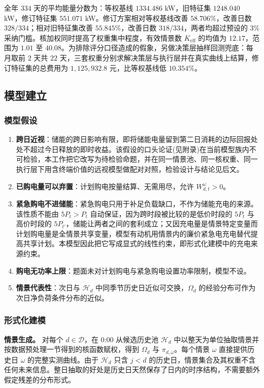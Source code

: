 全年 $334$ 天的平均能量分数为：等权基线 $1334.486$ kW，旧特征集 $1248.040$ kW，修订特征集 $551.071$ kW。修订方案相对等权基线改善 $58.706\%$，改善日数 $328/334$；相对旧特征集改善 $55.845\%$，改善日数 $318/334$，两者均超过预设的 $3\%$ 采纳门槛。核加权同时提高了权重集中程度，有效情景数 $K_{\mathrm{eff}}$ 的均值为 $12.17$，范围为 $1.01$ 至 $40.08$。为排除评分口径造成的假象，另做决策层抽样回测兜底：每月取前 $2$ 天共 $22$ 天，三套权重分别求解决策层与执行层并在真实曲线上结算，修订特征集的总费用为 $1{,}125{,}932.8$ 元，比等权基线低 $10.354\%$。

\subsection{模型建立}

\subsubsection{模型假设}

\begin{enumerate}
\item \textbf{跨日近视}：储能的跨日影响有限，即将储能电量留到第二日消耗的边际回报处处不超过今日释放的即时收益。该假设的口头论证(见附录)在当前模型族内不可检验，本工作把它改写为待检验命题，并在同一情景池、同一核权重、同一执行层下用含终端价值的远视模型做配对对照，检验设计与结论见后文。
\item \textbf{已购电量可以弃置}：计划购电按量结算、无需用尽，允许 $W_{d,t}^{\omega}>0$。
\item \textbf{紧急购电不进储能}：紧急购电只用于补足负载缺口，不作为储能充电的来源。该性质不能由 $5P_t>P_t$ 自动保证，因为跨时段被比较的是低价时段的 $5P_t$ 与高价时段的 $5P_{t'}$，储能让两者之间的套利成立；又因充电量是情景特定变量而计划购电量是全情景共享变量，模型有动机用情景内的廉价紧急电充电替代提高共享计划。本模型因此把它写成显式的线性约束，即形式化建模中的充电来源约束。
\item \textbf{购电无功率上限}：题面未对计划购电与紧急购电设置功率限制，模型不设。
\item \textbf{情景代表性}：次日与 $\mathcal{H}_d$ 中同季节历史日近似可交换，$\Omega_d$ 的经验分布可作为次日净负荷条件分布的近似。
\end{enumerate}

\subsubsection{形式化建模}

\textbf{情景生成。} 对每个 $d\in\mathcal{D}$，在 0:00 从候选历史池 $\mathcal{H}_d$ 中以整天为单位抽取情景并按数据预处理一节得到的核函数赋权，得到 $\Omega_d$ 与 $\pi_{d,\omega}$。每个情景 $\omega$ 直接提供历史日 $\omega$ 的完整实测曲线。由于 $\mathcal{H}_d$ 只含 $j<d$ 的历史日，情景集合及其权重不含任何未来信息。整日抽取的好处是历史日天然保存了日内的时序结构，不需要额外假定残差的分布形式。


